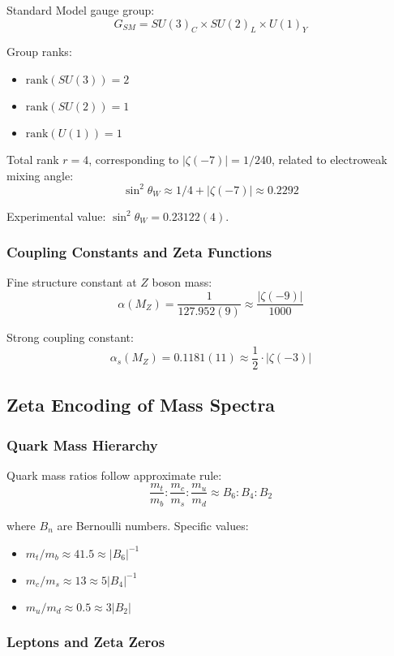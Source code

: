 \documentclass[11pt]{article}
\begin{document}
Standard Model gauge group:
$$G_{SM} = SU(3)_C \times SU(2)_L \times U(1)_Y$$

Group ranks:
\begin{itemize}
\item $\text{rank}(SU(3)) = 2$
\item $\text{rank}(SU(2)) = 1$
\item $\text{rank}(U(1)) = 1$
\end{itemize}

Total rank $r = 4$, corresponding to $|\zeta(-7)| = 1/240$, related to electroweak mixing angle:
$$\sin^2 \theta_W \approx 1/4 + |\zeta(-7)| \approx 0.2292$$

Experimental value: $\sin^2 \theta_W = 0.23122(4)$.

\subsubsection{Coupling Constants and Zeta Functions}

Fine structure constant at $Z$ boson mass:
$$\alpha(M_Z) = \frac{1}{127.952(9)} \approx \frac{|\zeta(-9)|}{1000}$$

Strong coupling constant:
$$\alpha_s(M_Z) = 0.1181(11) \approx \frac{1}{2} \cdot |\zeta(-3)|$$

\subsection{Zeta Encoding of Mass Spectra}

\subsubsection{Quark Mass Hierarchy}

Quark mass ratios follow approximate rule:
$$\frac{m_t}{m_b} : \frac{m_c}{m_s} : \frac{m_u}{m_d} \approx B_6 : B_4 : B_2$$

where $B_n$ are Bernoulli numbers. Specific values:
\begin{itemize}
\item $m_t/m_b \approx 41.5 \approx |B_6|^{-1}$
\item $m_c/m_s \approx 13 \approx 5|B_4|^{-1}$
\item $m_u/m_d \approx 0.5 \approx 3|B_2|$
\end{itemize}

\subsubsection{Leptons and Zeta Zeros}
\end{document}
